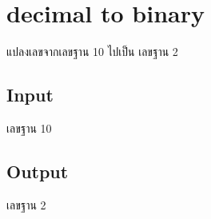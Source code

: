 \documentclass{article}
\begin{document}
\section*{decimal to binary}

{แปลงเลขจากเลขฐาน 10 ไปเป็น เลขฐาน 2}\\



\subsection*{Input}
{เลขฐาน 10}\\



\subsection*{Output}
{เลขฐาน 2}\\
\end{document}

